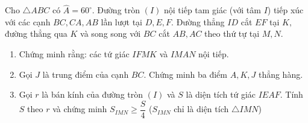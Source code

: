 \begin{bt}
{\begin{enumerate}
		\end{enumerate}
	}
\end{bt}

\begin{bt}%
	Cho $\triangle ABC$ có $\widehat{A}=60^\circ$.
	Đường tròn $(I)$ nội tiếp tam giác (với tâm $I$) tiếp xúc với các cạnh $BC, CA, AB$ lần lượt tại $D, E, F.$ 
	Đường thẳng $ID$ cắt $EF$ tại $K,$ đường thẳng qua $K$ và song song với $BC$ cắt $AB, AC$ theo thứ tự tại $M, N.$
	\begin{enumerate}
		\item Chứng minh rằng: các tứ giác $IFMK$ và $IMAN$ nội tiếp.
		\item Gọi $J$ là trung điểm của cạnh $BC.$ Chứng minh ba điểm $A, K, J$ thẳng hàng.
		\item Gọi $r$ là bán kính của đường tròn $(I)$ và $S$ là diện tích tứ giác $IEAF.$
		Tính $S$ theo $r$ và chứng minh $S_{IMN}\ge \dfrac{S}{4}$ ($S_{IMN}$ chỉ là diện tích $\triangle IMN$)
	\end{enumerate}
	

\end{bt}
